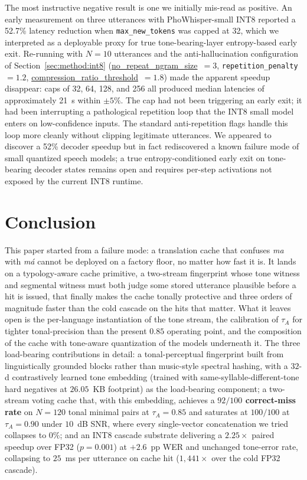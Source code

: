 \documentclass[a4paper,fleqn]{cas-dc}
\begin{document}
The most instructive negative result is one we initially mis-read as positive. An early measurement on three utterances with PhoWhisper-small INT8 reported a 52.7\% latency reduction when \texttt{max\_new\_tokens} was capped at 32, which we interpreted as a deployable proxy for true tone-bearing-layer entropy-based early exit. Re-running with $N = 10$ utterances and the anti-hallucination configuration of Section~\ref{sec:method:int8} (\url{no_repeat_ngram_size}~$=3$, \texttt{repetition\_penalty}~$=1.2$, \url{compression_ratio_threshold}~$=1.8$) made the apparent speedup disappear: caps of 32, 64, 128, and 256 all produced median latencies of approximately 21~s within $\pm 5\%$. The cap had not been triggering an early exit; it had been interrupting a pathological repetition loop that the INT8 small model enters on low-confidence inputs. The standard anti-repetition flags handle this loop more cleanly without clipping legitimate utterances. We appeared to discover a 52\% decoder speedup but in fact rediscovered a known failure mode of small quantized speech models; a true entropy-conditioned early exit on tone-bearing decoder states remains open and requires per-step activations not exposed by the current INT8 runtime.

\FloatBarrier
\section{Conclusion}\label{sec:conclusion}

This paper started from a failure mode: a translation cache that confuses \emph{ma} with \emph{m\'a} cannot be deployed on a factory floor, no matter how fast it is. It lands on a typology-aware cache primitive, a two-stream fingerprint whose tone witness and segmental witness must both judge some stored utterance plausible before a hit is issued, that finally makes the cache tonally protective and three orders of magnitude faster than the cold cascade on the hits that matter. What it leaves open is the per-language instantiation of the tone stream, the calibration of $\tau_{A}$ for tighter tonal-precision than the present $0.85$ operating point, and the composition of the cache with tone-aware quantization of the models underneath it. The three load-bearing contributions in detail: a tonal-perceptual fingerprint built from linguistically grounded blocks rather than music-style spectral hashing, with a $32$-d contrastively learned tone embedding (trained with same-syllable-different-tone hard negatives at $26.05$~KB footprint) as the load-bearing component; a two-stream voting cache that, with this embedding, achieves a \textbf{$92/100$ correct-miss rate} on $N=120$ tonal minimal pairs at $\tau_{A}=0.85$ and saturates at $100/100$ at $\tau_A=0.90$ under $10$~dB SNR, where every single-vector concatenation we tried collapses to $0\%$; and an INT8 cascade substrate delivering a \textbf{$2.25\times$} paired speedup over FP32 ($p = 0.001$) at $+2.6$~pp WER and unchanged tone-error rate, collapsing to $25$~ms per utterance on cache hit ($1{,}441\times$ over the cold FP32 cascade).
\end{document}
